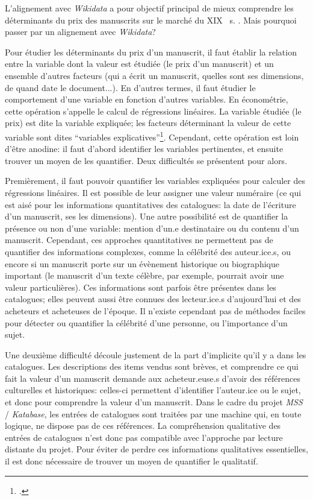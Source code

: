 \documentclass[a4paper, 12pt, twoside]{book}
\newcommand{\scl}[1]{%
	#1%
	\ifthenelse{\equal{#1}{I}}{\up{er}}{\up{ème}}%
	~s.%
}
\newcommand{\ktb}{\textit{Katabase}}
\newcommand{\mss}{\textit{MSS}}
\newcommand{\mssktb}{\mss{} / \ktb{}}
\newcommand{\wkd}{\textit{Wikidata}}
\begin{document}
L'alignement avec \wkd{} a pour objectif principal de mieux comprendre les déterminants du prix des manuscrits sur le marché du \scl{XIX}. Mais pourquoi passer par un alignement avec \wkd{}? 

Pour étudier les déterminants du prix d'un manuscrit, il faut établir la relation entre la variable dont la valeur est étudiée (le prix d'un manuscrit) et un ensemble d'autres facteurs (qui a écrit un manuscrit, quelles sont ses dimensions, de quand date le document...). En d'autres termes, il faut étudier le comportement d'une variable en fonction d'autres variables. En économétrie, cette opération s'appelle le calcul de régressions linéaires. La variable étudiée (le prix) est dite la variable expliquée; les facteurs déterminant la valeur de cette variable sont dites \enquote{variables explicatives}\footcite{noauthor_regression_2022}. Cependant, cette opération est loin d'être anodine: il faut d'abord identifier les variables pertinentes, et ensuite trouver un moyen de les quantifier. Deux difficultés se présentent pour alors.

Premièrement, il faut pouvoir quantifier les variables expliquées pour calculer des régressions linéaires. Il est possible de leur assigner une valeur numéraire (ce qui est aisé pour les informations quantitatives des catalogues: la date de l'écriture d'un manuscrit, ses les dimensions). Une autre possibilité est de quantifier la présence ou non d'une variable: mention d'un.e destinataire ou du contenu d'un manuscrit. Cependant, ces approches quantitatives ne permettent pas de quantifier des informations complexes, comme la célébrité des auteur.ice.s, ou encore si un manuscrit porte sur un évènement historique ou biographique important (le manuscrit d'un texte célèbre, par exemple, pourrait avoir une valeur particulières). Ces informations sont parfois être présentes dans les catalogues; elles peuvent aussi être connues des lecteur.ice.s d'aujourd'hui et des acheteurs et acheteuses de l'époque. Il n'existe cependant pas de méthodes faciles pour détecter ou quantifier la célébrité d'une personne, ou l'importance d'un sujet.

Une deuxième difficulté découle justement de la part d'implicite qu'il y a dans les catalogues. Les descriptions des items vendus sont brèves, et comprendre ce qui fait la valeur d'un manuscrit demande aux acheteur.euse.s d'avoir des références culturelles et historiques: celles-ci permettent d'identifier l'auteur.ice ou le sujet, et donc pour comprendre la valeur d'un manuscrit. Dans le cadre du projet \mssktb{}, les entrées de catalogues sont traitées par une machine qui, en toute logique, ne dispose pas de ces références. La compréhension qualitative des entrées de catalogues n'est donc pas compatible avec l'approche par lecture distante du projet. Pour éviter de perdre ces informations qualitatives essentielles, il est donc nécessaire de trouver un moyen de quantifier le qualitatif.
\end{document}
